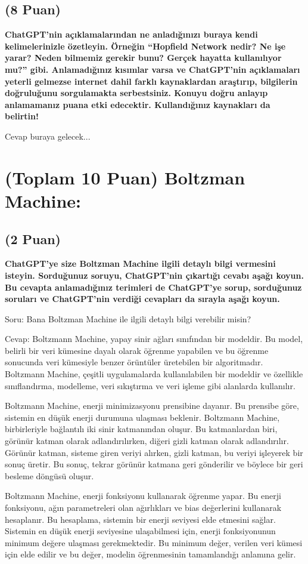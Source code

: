 \documentclass[11pt]{article}
\begin{document}
\subsection{(8 Puan)} \textbf{ChatGPT’nin açıklamalarından ne anladığınızı buraya kendi kelimelerinizle özetleyin. Örneğin ``Hopfield Network nedir? Ne işe yarar? Neden bilmemiz gerekir bunu? Gerçek hayatta kullanılıyor mu?'' gibi. Anlamadığınız kısımlar varsa ve ChatGPT’nin açıklamaları yeterli gelmezse internet dahil farklı kaynaklardan araştırıp, bilgilerin doğruluğunu sorgulamakta serbestsiniz. Konuyu doğru anlayıp anlamamanız puana etki edecektir. Kullandığınız kaynakları da belirtin!}

Cevap buraya gelecek...

\section{(Toplam 10 Puan) Boltzman Machine:}

\subsection{(2 Puan)} \textbf{ChatGPT’ye size Boltzman Machine ilgili detaylı bilgi vermesini isteyin. Sorduğunuz soruyu, ChatGPT'nin çıkartığı cevabı aşağı koyun. Bu cevapta anlamadığınız terimleri de ChatGPT’ye sorup, sorduğunuz soruları ve ChatGPT’nin verdiği cevapları da sırayla aşağı koyun.}

Soru: Bana Boltzman Machine ile ilgili detaylı bilgi verebilir misin?

Cevap: Boltzmann Machine, yapay sinir ağları sınıfından bir modeldir. Bu model, belirli bir veri kümesine dayalı olarak öğrenme yapabilen ve bu öğrenme sonucunda veri kümesiyle benzer örüntüler üretebilen bir algoritmadır. Boltzmann Machine, çeşitli uygulamalarda kullanılabilen bir modeldir ve özellikle sınıflandırma, modelleme, veri sıkıştırma ve veri işleme gibi alanlarda kullanılır.

Boltzmann Machine, enerji minimizasyonu prensibine dayanır. Bu prensibe göre, sistemin en düşük enerji durumuna ulaşması beklenir. Boltzmann Machine, birbirleriyle bağlantılı iki sinir katmanından oluşur. Bu katmanlardan biri, görünür katman olarak adlandırılırken, diğeri gizli katman olarak adlandırılır. Görünür katman, sisteme giren veriyi alırken, gizli katman, bu veriyi işleyerek bir sonuç üretir. Bu sonuç, tekrar görünür katmana geri gönderilir ve böylece bir geri besleme döngüsü oluşur.

Boltzmann Machine, enerji fonksiyonu kullanarak öğrenme yapar. Bu enerji fonksiyonu, ağın parametreleri olan ağırlıkları ve bias değerlerini kullanarak hesaplanır. Bu hesaplama, sistemin bir enerji seviyesi elde etmesini sağlar. Sistemin en düşük enerji seviyesine ulaşabilmesi için, enerji fonksiyonunun minimum değere ulaşması gerekmektedir. Bu minimum değer, verilen veri kümesi için elde edilir ve bu değer, modelin öğrenmesinin tamamlandığı anlamına gelir.
\end{document}

